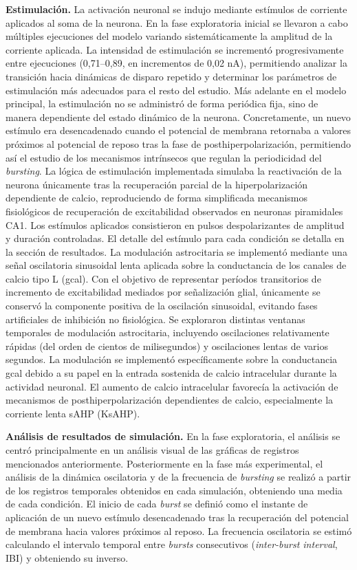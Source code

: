 \documentclass[12pt,a4paper]{report}
\begin{document}
\textbf{Estimulación.}
La activación neuronal se indujo mediante estímulos de corriente aplicados al soma de la neurona. 
En la fase exploratoria inicial se llevaron a cabo múltiples ejecuciones del modelo variando sistemáticamente la amplitud de la corriente aplicada. La intensidad de estimulación se incrementó progresivamente entre ejecuciones (0,71–0,89, en incrementos de 0,02 nA), permitiendo analizar la transición hacia dinámicas de disparo repetido y determinar los parámetros de estimulación más adecuados para el resto del estudio.
Más adelante en el modelo principal, la estimulación no se administró de forma periódica fija, sino de manera dependiente del estado dinámico de la neurona. Concretamente, un nuevo estímulo era desencadenado cuando el potencial de membrana retornaba a valores próximos al potencial de reposo tras la fase de posthiperpolarización, permitiendo así el estudio de los mecanismos intrínsecos que regulan la periodicidad del \textit{bursting}. La lógica de estimulación implementada simulaba la reactivación de la neurona únicamente tras la recuperación parcial de la hiperpolarización dependiente de calcio, reproduciendo de forma simplificada mecanismos fisiológicos de recuperación de excitabilidad observados en neuronas piramidales CA1. Los estímulos aplicados consistieron en pulsos despolarizantes de amplitud y duración controladas. El detalle del estímulo para cada condición se detalla en la sección de resultados.
La modulación astrocitaria se implementó mediante una señal oscilatoria sinusoidal lenta aplicada sobre la conductancia de los canales de calcio tipo L (gcal). Con el objetivo de representar períodos transitorios de incremento de excitabilidad mediados por señalización glial, únicamente se conservó la componente positiva de la oscilación sinusoidal, evitando fases artificiales de inhibición no fisiológica. Se exploraron distintas ventanas temporales de modulación astrocitaria, incluyendo oscilaciones relativamente rápidas (del orden de cientos de milisegundos) y oscilaciones lentas de varios segundos. La modulación se implementó específicamente sobre la conductancia gcal debido a su papel en la entrada sostenida de calcio intracelular durante la actividad neuronal. El aumento de calcio intracelular favorecía la activación de mecanismos de posthiperpolarización dependientes de calcio, especialmente la corriente lenta sAHP (KsAHP).

\textbf{Análisis de resultados de simulación.}
En la fase exploratoria, el análisis se centró principalmente en un análisis visual de las gráficas de registros mencionados anteriormente. Posteriormente en la fase más experimental, el análisis de la dinámica oscilatoria y de la frecuencia de \textit{bursting} se realizó a partir de los registros temporales obtenidos en cada simulación, obteniendo una media de cada condición. El inicio de cada \textit{burst} se definió como el instante de aplicación de un nuevo estímulo desencadenado tras la recuperación del potencial de membrana hacia valores próximos al reposo. La frecuencia oscilatoria se estimó calculando el intervalo temporal entre \textit{bursts} consecutivos (\textit{inter-burst interval}, IBI) y obteniendo su inverso.
\end{document}
